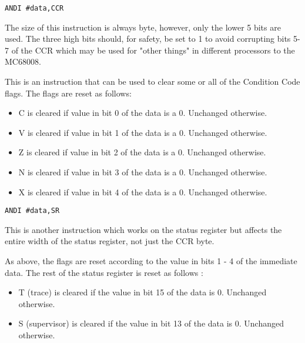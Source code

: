 \begin{lstlisting}[firstnumber=1,]
          ANDI #data,CCR 
\end{lstlisting}

The size of this instruction is always byte, however, only the lower 5 bits are used. The 
   three high bits should, for safety, be set to 1 to avoid corrupting bits 5-7 of the CCR 
   which may be used for "other things" in different processors to the MC68008.

This is an instruction that can be used to clear some or all of
    the Condition Code flags. The flags are reset as follows:
\begin{itemize}[itemsep=0pt]

\item{}C is cleared if value in bit 0 of the data is a 0. Unchanged otherwise.


\item{}V is cleared if value in bit 1 of the data is a 0. Unchanged otherwise.


\item{}Z is cleared if value in bit 2 of the data is a 0. Unchanged otherwise.


\item{}N is cleared if value in bit 3 of the data is a 0. Unchanged otherwise.


\item{}X is cleared if value in bit 4 of the data is a 0. Unchanged otherwise.

\end{itemize}

\begin{lstlisting}[firstnumber=1,]
          ANDI #data,SR
\end{lstlisting}

This is another instruction which works on the status register but
    affects the entire width of the status register, not just the CCR
    byte.

As above, the flags are reset according to the value in bits 1 -{} 4
    of the immediate data. The rest of the status register is reset as follows
   :
\begin{itemize}[itemsep=0pt]

\item{}T (trace) is cleared if the value in bit 15 of the data is
        0. Unchanged otherwise.


\item{}S (supervisor) is cleared if the value in bit 13 of the data is
        0. Unchanged otherwise.

\end{itemize}

